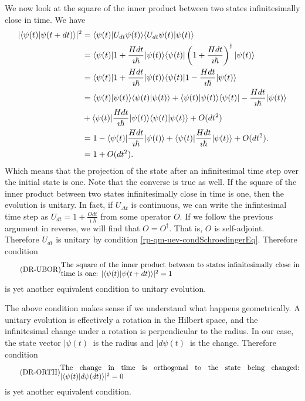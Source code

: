 We now look at the square of the inner product between two states infinitesimally close in time. We have
\begin{equation}
	\begin{aligned}
		|\langle\psi(t) | \psi(t + dt)\rangle|^2 &= \langle \psi(t) | U_{d t} \psi(t)\rangle \langle U_{d t} \psi(t) | \psi(t)\rangle \\
		&=\langle  \psi(t) | 1 + \frac{H dt}{\imath \hbar} | \psi(t)\rangle \langle\psi(t) | \left(1 + \frac{H dt}{\imath \hbar} \right)^{\dagger}| \psi(t)\rangle \\
		&=\langle  \psi(t) | 1 + \frac{H dt}{\imath \hbar} | \psi(t)\rangle \langle\psi(t) | 1 - \frac{H dt}{\imath \hbar} | \psi(t)\rangle \\
		&=\langle \psi(t) | \psi(t)\rangle \langle \psi(t) | \psi(t)\rangle + \langle  \psi(t) | \psi(t)\rangle \langle\psi(t) | - \frac{H dt}{\imath \hbar} | \psi(t)\rangle \\
		&+ \langle \psi(t) | \frac{H dt}{\imath \hbar} | \psi(t)\rangle \langle\psi(t) | \psi(t)\rangle + O(dt^2)\\
		&=1 - \langle\psi(t) | \frac{H dt}{\imath \hbar} | \psi(t)\rangle + \langle\psi(t) | \frac{H dt}{\imath \hbar} | \psi(t)\rangle+ O(dt^2). \\
		&=1 + O(dt^2).
	\end{aligned}
\end{equation}
Which means that the projection of the state after an infinitesimal time step over the initial state is one. Note that the converse is true as well. If the square of the inner product between two states infinitesimally close in time is one, then the evolution is unitary. In fact, if $U_{\Delta t}$ is continuous, we can write the infintesimal time step as $U_{d t} = 1 + \frac{O dt}{\imath \hbar}$ from some operator $O$. If we follow the previous argument in reverse, we will find that $O = O^\dagger$. That is, $O$ is self-adjoint. Therefore $U_{dt}$ is unitary by condition \ref{rp-qm-uev-condSchroedingerEq}. Therefore condition
\begin{equation}\label{rp-qm-uev-condUnitaryBorn}
	\tag{DR-UBOR}
	\eqtext{The square of the inner product between to states infinitesimally close in time is one: $|\< \psi(t) | \psi(t + dt) \> |^2 = 1$} 
\end{equation}
is yet another equivalent condition to unitary evolution.

The above condition makes sense if we understand what happens geometrically. A unitary evolution is effectively a rotation in the Hilbert space, and the infinitesimal change under a rotation is perpendicular to the radius. In our case, the state vector $|\psi(t)\>$ is the radius and $|d\psi(t)\>$ is the change. Therefore condition
\begin{equation}\label{rp-qm-uev-condOrthogonalChange}
	\tag{DR-ORTH}
	\eqtext{The change in time is orthogonal to the state being changed: $|\< \psi(t) | d\psi(dt) \> |^2 = 0$} 
\end{equation}
is yet another equivalent condition.

